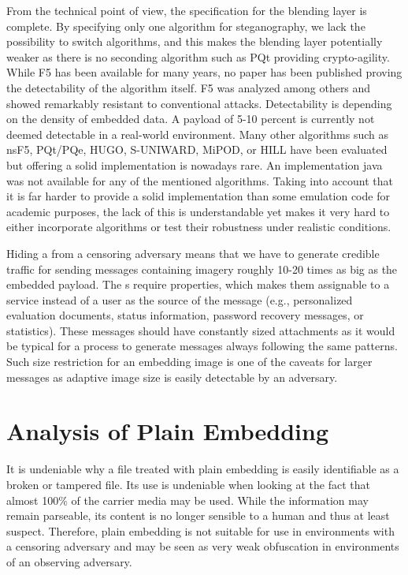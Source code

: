 From the technical point of view, the specification for the blending layer is complete. By specifying only one algorithm for steganography, we lack the possibility to switch algorithms, and this makes the blending layer potentially weaker as there is no seconding algorithm such as PQt providing crypto-agility. While F5 has been available for many years, no paper has been published proving the detectability of the algorithm itself. F5 was analyzed among others and showed remarkably resistant to conventional attacks. Detectability is depending on the density of embedded data. A payload of 5-10 percent is currently not deemed detectable in a real-world environment\cite{fridrich2007statistically}. Many other algorithms such as nsF5, PQt/PQe, HUGO\cite{pevny2010using}, S-UNIWARD\cite{holub2014universal}, MiPOD\cite{sedighi2015content}, or HILL\cite{li2014new} have been evaluated but offering a solid implementation is nowadays rare. An implementation java was not available for any of the mentioned algorithms. Taking into account that it is far harder to provide a solid implementation than some emulation code for academic purposes, the lack of this is understandable yet makes it very hard to either incorporate algorithms or test their robustness under realistic conditions.

Hiding a \VortexNode{} from a censoring adversary means that we have to generate credible traffic for sending messages containing imagery roughly 10-20 times as big as the embedded payload. The s require properties, which makes them assignable to a service instead of a user as the source of the message (e.g., personalized evaluation documents, status information, password recovery messages, or statistics). These messages should have constantly sized attachments as it would be typical for a process to generate messages always following the same patterns. Such size restriction for an embedding image is one of the caveats for larger messages as adaptive image size is easily detectable by an adversary. 

\section{Analysis of Plain Embedding}
It is undeniable why a file treated with plain embedding is easily identifiable as a broken or tampered file. Its use is undeniable when looking at the fact that almost 100\% of the carrier media may be used. While the information may remain parseable, its content is no longer sensible to a human and thus at least suspect. Therefore, plain embedding is not suitable for use in environments with a censoring adversary and may be seen as very weak obfuscation in environments of an observing adversary.

